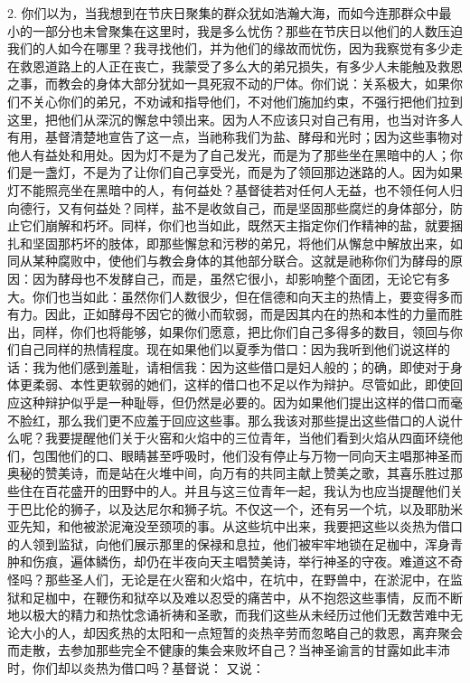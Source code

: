 2. 你们以为，当我想到在节庆日聚集的群众犹如浩瀚大海，而如今连那群众中最小的一部分也未曾聚集在这里时，我是多么忧伤？那些在节庆日以他们的人数压迫我们的人如今在哪里？我寻找他们，并为他们的缘故而忧伤，因为我察觉有多少走在救恩道路上的人正在丧亡，我蒙受了多么大的弟兄损失，有多少人未能触及救恩之事，而教会的身体大部分犹如一具死寂不动的尸体。你们说：关系极大，如果你们不关心你们的弟兄，不劝诫和指导他们，不对他们施加约束，不强行把他们拉到这里，把他们从深沉的懈怠中领出来。因为人不应该只对自己有用，也当对许多人有用，基督清楚地宣告了这一点，当祂称我们为盐、酵母和光时；因为这些事物对他人有益处和用处。因为灯不是为了自己发光，而是为了那些坐在黑暗中的人；你们是一盏灯，不是为了让你们自己享受光，而是为了领回那边迷路的人。因为如果灯不能照亮坐在黑暗中的人，有何益处？基督徒若对任何人无益，也不领任何人归向德行，又有何益处？同样，盐不是收敛自己，而是坚固那些腐烂的身体部分，防止它们崩解和朽坏。同样，你们也当如此，既然天主指定你们作精神的盐，就要捆扎和坚固那朽坏的肢体，即那些懈怠和污秽的弟兄，将他们从懈怠中解放出来，如同从某种腐败中，使他们与教会身体的其他部分联合。这就是祂称你们为酵母的原因：因为酵母也不发酵自己，而是，虽然它很小，却影响整个面团，无论它有多大。你们也当如此：虽然你们人数很少，但在信德和向天主的热情上，要变得多而有力。因此，正如酵母不因它的微小而软弱，而是因其内在的热和本性的力量而胜出，同样，你们也将能够，如果你们愿意，把比你们自己多得多的数目，领回与你们自己同样的热情程度。现在如果他们以夏季为借口：因为我听到他们说这样的话：我为他们感到羞耻，请相信我：因为这些借口是妇人般的；的确，即使对于身体更柔弱、本性更软弱的她们，这样的借口也不足以作为辩护。尽管如此，即使回应这种辩护似乎是一种耻辱，但仍然是必要的。因为如果他们提出这样的借口而毫不脸红，那么我们更不应羞于回应这些事。那么我该对那些提出这些借口的人说什么呢？我要提醒他们关于火窑和火焰中的三位青年，当他们看到火焰从四面环绕他们，包围他们的口、眼睛甚至呼吸时，他们没有停止与万物一同向天主唱那神圣而奥秘的赞美诗，而是站在火堆中间，向万有的共同主献上赞美之歌，其喜乐胜过那些住在百花盛开的田野中的人。并且与这三位青年一起，我认为也应当提醒他们关于巴比伦的狮子，以及达尼尔和狮子坑。不仅这一个，还有另一个坑，以及耶肋米亚先知，和他被淤泥淹没至颈项的事。从这些坑中出来，我要把这些以炎热为借口的人领到监狱，向他们展示那里的保禄和息拉，他们被牢牢地锁在足枷中，浑身青肿和伤痕，遍体鳞伤，却仍在半夜向天主唱赞美诗，举行神圣的守夜。难道这不奇怪吗？那些圣人们，无论是在火窑和火焰中，在坑中，在野兽中，在淤泥中，在监狱和足枷中，在鞭伤和狱卒以及难以忍受的痛苦中，从不抱怨这些事情，反而不断地以极大的精力和热忱念诵祈祷和圣歌，而我们这些从未经历过他们无数苦难中无论大小的人，却因炙热的太阳和一点短暂的炎热辛劳而忽略自己的救恩，离弃聚会而走散，去参加那些完全不健康的集会来败坏自己？当神圣谕言的甘露如此丰沛时，你们却以炎热为借口吗？基督说： 又说： 